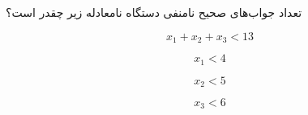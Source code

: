 \EXERCISE
تعداد جواب‌های صحیح نامنفی دستگاه نامعادله زیر چقدر است؟

$$x_1 + x_2 + x_3 < 13$$

$$x_1 < 4$$

$$x_2 < 5$$

$$x_3 < 6$$
